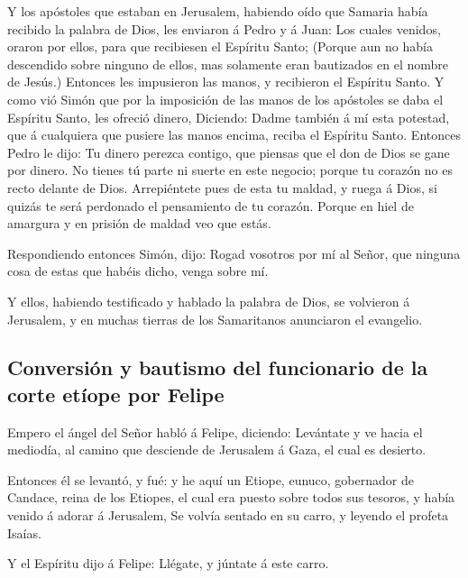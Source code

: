  Y los apóstoles que estaban en Jerusalem, habiendo oído
que Samaria había recibido la palabra de Dios, les enviaron á Pedro y á
Juan:  Los cuales venidos, oraron por ellos, para que
recibiesen el Espíritu Santo;  (Porque aun no había
descendido sobre ninguno de ellos, mas solamente eran bautizados en el
nombre de Jesús.)  Entonces les impusieron las manos, y
recibieron el Espíritu Santo.  Y como vió Simón que por
la imposición de las manos de los apóstoles se daba el Espíritu Santo,
les ofreció dinero,  Diciendo: Dadme también á mí esta
potestad, que á cualquiera que pusiere las manos encima, reciba el
Espíritu Santo.  Entonces Pedro le dijo: Tu dinero
perezca contigo, que piensas que el don de Dios se gane por dinero.
 No tienes tú parte ni suerte en este negocio; porque tu
corazón no es recto delante de Dios.  Arrepiéntete pues
de esta tu maldad, y ruega á Dios, si quizás te será perdonado el
pensamiento de tu corazón.  Porque en hiel de amargura y
en prisión de maldad veo que estás.

 Respondiendo entonces Simón, dijo: Rogad vosotros por mí
al Señor, que ninguna cosa de estas que habéis dicho, venga sobre mí.

 Y ellos, habiendo testificado y hablado la palabra de
Dios, se volvieron á Jerusalem, y en muchas tierras de los Samaritanos
anunciaron el evangelio.

\hypertarget{conversiuxf3n-y-bautismo-del-funcionario-de-la-corte-etuxedope-por-felipe}{%
\subsection{Conversión y bautismo del funcionario de la corte etíope por
Felipe}\label{conversiuxf3n-y-bautismo-del-funcionario-de-la-corte-etuxedope-por-felipe}}

 Empero el ángel del Señor habló á Felipe, diciendo:
Levántate y ve hacia el mediodía, al camino que desciende de Jerusalem á
Gaza, el cual es desierto.

 Entonces él se levantó, y fué: y he aquí un Etiope,
eunuco, gobernador de Candace, reina de los Etiopes, el cual era puesto
sobre todos sus tesoros, y había venido á adorar á Jerusalem,
 Se volvía sentado en su carro, y leyendo el profeta
Isaías.

 Y el Espíritu dijo á Felipe: Llégate, y júntate á este
carro.

